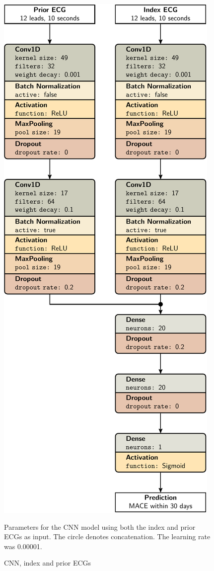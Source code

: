 \documentclass[preprint]{elsarticle}
\begin{document}
\begin{figure}[H]
\centering
\includegraphics[scale=\modelscale,keepaspectratio,trim=0 0 -16em 0]{figures/model-cnn2.pdf}
\caption{CNN, index and prior ECGs}
\medskip
\small
Parameters for the CNN model using both the index and prior ECGs as input. The circle denotes concatenation. The learning rate was 0.00001.
\end{figure}
\end{document}
